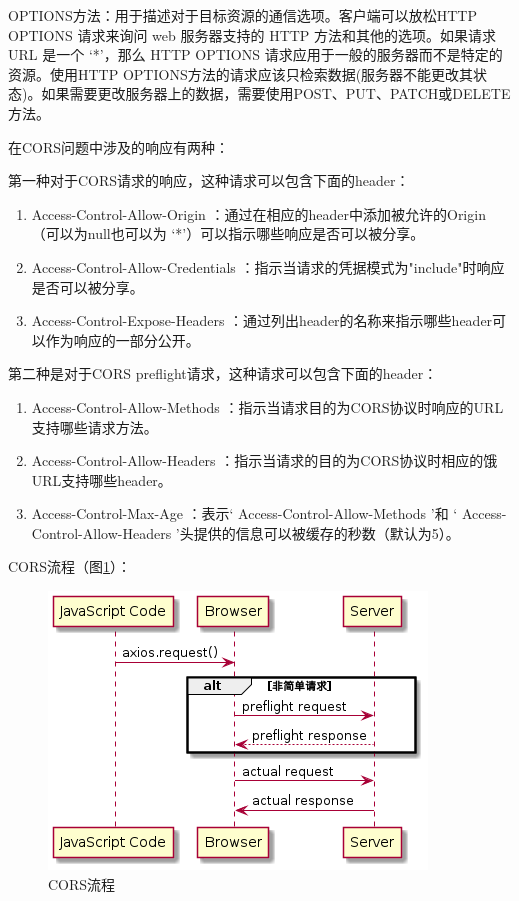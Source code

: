 OPTIONS方法：用于描述对于目标资源的通信选项。客户端可以放松HTTP OPTIONS 请求来询问 web 服务器支持的 HTTP 方法和其他的选项。如果请求 URL 是一个 ‘*’，那么 HTTP OPTIONS 请求应用于一般的服务器而不是特定的资源。使用HTTP OPTIONS方法的请求应该只检索数据(服务器不能更改其状态)。如果需要更改服务器上的数据，需要使用POST、PUT、PATCH或DELETE方法。

在CORS问题中涉及的响应有两种：

第一种对于CORS请求的响应，这种请求可以包含下面的header：

\begin{enumerate}[label=\circled{\arabic*}]
  \item  Access-Control-Allow-Origin ：通过在相应的header中添加被允许的Origin（可以为null也可以为 ‘*’）可以指示哪些响应是否可以被分享。
  \item  Access-Control-Allow-Credentials ：指示当请求的凭据模式为"include"时响应是否可以被分享。
  \item  Access-Control-Expose-Headers ：通过列出header的名称来指示哪些header可以作为响应的一部分公开。
\end{enumerate}

第二种是对于CORS preflight请求，这种请求可以包含下面的header：

\begin{enumerate}[label=\circled{\arabic*}]
  \item  Access-Control-Allow-Methods ：指示当请求目的为CORS协议时响应的URL支持哪些请求方法。
  \item  Access-Control-Allow-Headers ：指示当请求的目的为CORS协议时相应的饿URL支持哪些header。
  \item  Access-Control-Max-Age ：表示‘ Access-Control-Allow-Methods ’和  ‘ Access-Control-Allow-Headers ’头提供的信息可以被缓存的秒数（默认为5）。
\end{enumerate}

CORS流程（图\ref{CORS-flow}）：

\begin{figure}[htbp]
  \centering
  \includegraphics[scale = 0.6]{out/uml/时序图/CORS-flow/CORS-flow.png}
  \caption{\song\wuhao CORS流程}
  \label{CORS-flow}
\end{figure}

